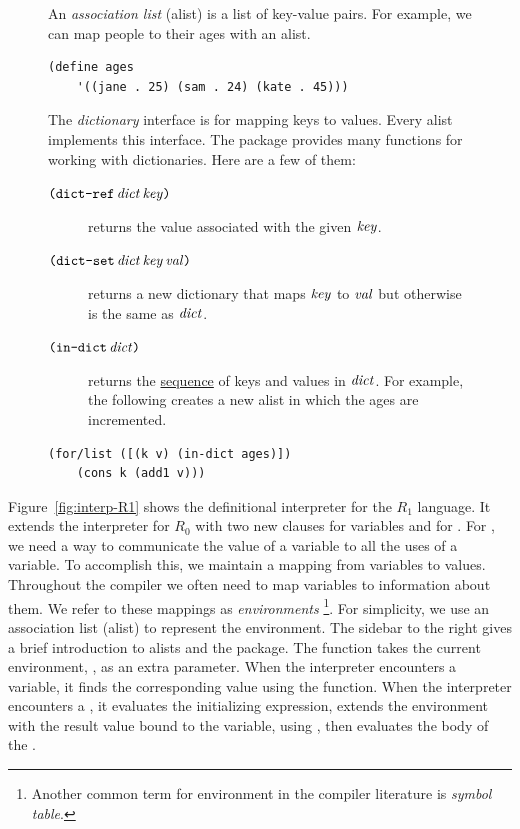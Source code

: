 \documentclass[11pt]{book}
\begin{document}
\begin{figure}
  \small
  \begin{tcolorbox}[title=Association Lists as Dictionaries]
  An \emph{association list} (alist) is a list of key-value pairs.
  For example, we can map people to their ages with an alist.
  \begin{lstlisting}[basicstyle=\ttfamily\footnotesize]
  (define ages
    '((jane . 25) (sam . 24) (kate . 45)))
  \end{lstlisting}
  The \emph{dictionary} interface is for mapping keys to values.
  Every alist implements this interface.  The package
  \href{https://docs.racket-lang.org/reference/dicts.html}{}
  provides many functions for working with dictionaries. Here
  are a few of them:
  \begin{description}
  \item[$\texttt{(}\texttt{dict-ref}\,\mathit{dict}\,\mathit{key}\texttt{)}$]
    returns the value associated with the given $\mathit{key}$.
  \item[$\texttt{(}\texttt{dict-set}\,\mathit{dict}\,\mathit{key}\,\mathit{val}\texttt{)}$]
    returns a new dictionary that maps $\mathit{key}$ to $\mathit{val}$
    but otherwise is the same as $\mathit{dict}$.
  \item[$\texttt{(}\texttt{in-dict}\,\mathit{dict}\texttt{)}$] returns the
    \href{https://docs.racket-lang.org/reference/sequences.html}{sequence}
    of keys and values in $\mathit{dict}$. For example, the following
    creates a new alist in which the ages are incremented.
  \end{description}
  \vspace{-10pt}
  \begin{lstlisting}[basicstyle=\ttfamily\footnotesize]
  (for/list ([(k v) (in-dict ages)])
    (cons k (add1 v)))
  \end{lstlisting}
\end{tcolorbox}
\end{figure}

Figure~\ref{fig:interp-R1} shows the definitional interpreter for the
$R_1$ language. It extends the interpreter for $R_0$ with two new
 clauses for variables and for .  For ,
we need a way to communicate the value of a variable to all the uses
of a variable. To accomplish this, we maintain a mapping from
variables to values. Throughout the compiler we often need to map
variables to information about them. We refer to these mappings as
\emph{environments}
\footnote{Another common term for environment in the compiler
  literature is \emph{symbol table}.}. For simplicity, we use an
association list (alist) to represent the environment. The sidebar to
the right gives a brief introduction to alists and the
 package.  The  function takes the
current environment, , as an extra parameter.  When the
interpreter encounters a variable, it finds the corresponding value
using the  function.  When the interpreter encounters a
, it evaluates the initializing expression, extends the
environment with the result value bound to the variable, using
, then evaluates the body of the .
\end{document}
